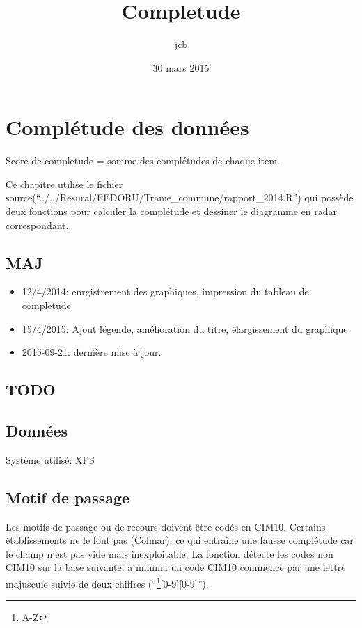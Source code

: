 \documentclass[]{article}
\title{Completude}
\author{jcb}
\date{30 mars 2015}
\let\rmarkdownfootnote\footnote%
\def\footnote{\protect\rmarkdownfootnote}
\begin{document}
\maketitle


{
\hypersetup{linkcolor=black}
\setcounter{tocdepth}{2}
\tableofcontents
}
\section{Complétude des données}\label{completude-des-donnees}

Score de completude = somme des complétudes de chaque item.

Ce chapitre utilise le fichier
source(``../../Resural/FEDORU/Trame\_commune/rapport\_2014.R'') qui
possède deux fonctions pour calculer la complétude et dessiner le
diagramme en radar correspondant.

\subsection{MAJ}\label{maj}

\begin{itemize}
\itemsep1pt\parskip0pt
\item
  12/4/2014: enrgistrement des graphiques, impression du tableau de
  completude
\item
  15/4/2015: Ajout légende, amélioration du titre, élargissement du
  graphique
\item
  2015-09-21: dernière mise à jour.
\end{itemize}

\subsection{TODO}\label{todo}

\subsection{Données}\label{donnees}

Système utilisé: XPS

\subsection{Motif de passage}\label{motif-de-passage}

Les motifs de passage ou de recours doivent être codés en CIM10.
Certains établissements ne le font pas (Colmar), ce qui entraîne une
fausse complétude car le champ n'est pas vide mais inexploitable. La
fonction détecte les codes non CIM10 sur la base suivante: a minima un
code CIM10 commence par une lettre majuscule suivie de deux chiffres
(``\footnote{A-Z}{[}0-9{]}{[}0-9{]}'').
\end{document}
